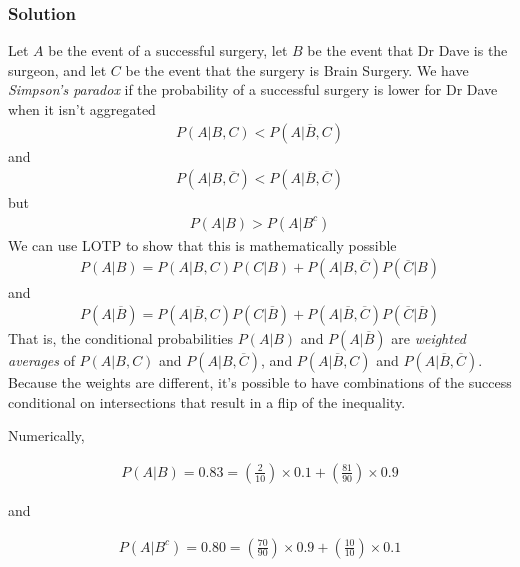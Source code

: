 \clearpage
\subsubsection{Solution}

Let \(A\) be the event of a successful surgery, 
let \(B\) be the event that Dr Dave is the surgeon, 
and let \(C\) be the event that the surgery is Brain Surgery. 
We have \emph{Simpson's paradox} if the probability of a successful surgery is 
lower for Dr Dave when it isn't aggregated
\begin{align}
P\left(A | B, C\right) < P(A|\overline{B},C)
\end{align}
and
\begin{align}
P\left(A | B, \overline{C}\right) < P(A|\overline{B},\overline{C})
\end{align}
but
\begin{align}
P\left(A | B \right) > P(A|B^{c})
\end{align}
We can use LOTP to show that this is mathematically possible
\begin{align}
P\left(A|B\right) = 
P\left(A|B,C\right)P\left(C|B\right) + P\left(A|B,\overline{C}\right)P(\overline{C}|B)
\end{align}
and
\begin{align}
P\left(A|\overline{B} \right) = 
P\left(A|\overline{B},C \right)P\left(C| \overline{B}\right) 
+ P\left(A|\overline{B},\overline{C}\right)P(\overline{C}|\overline{B})
\end{align}
That is, 
the conditional probabilities \(P(A|B)\) and \(P(A|\overline{B})\) 
are \emph{weighted averages} of \(P\left(A|B,C \right)\) and \(P(A|B,\overline{C})\), 
and \(P\left(A|\overline{B},C \right)\) and \(P(A|\overline{B},\overline{C})\). 
Because the weights are different, 
it's possible to have combinations of the success conditional on intersections that result in a flip of the inequality.

Numerically,

\begin{align}
P\left(A|B\right) = 0.83 = \left( \frac{2}{10} \right) \times 0.1 + \left(\frac{81}{90} \right) \times 0.9
\end{align}

and

\begin{align}
P\left(A|B^{c} \right) = 0.80 = \left(\frac{70}{90} \right) \times 0.9 + \left( \frac{10}{10} \right) \times 0.1
\end{align}

